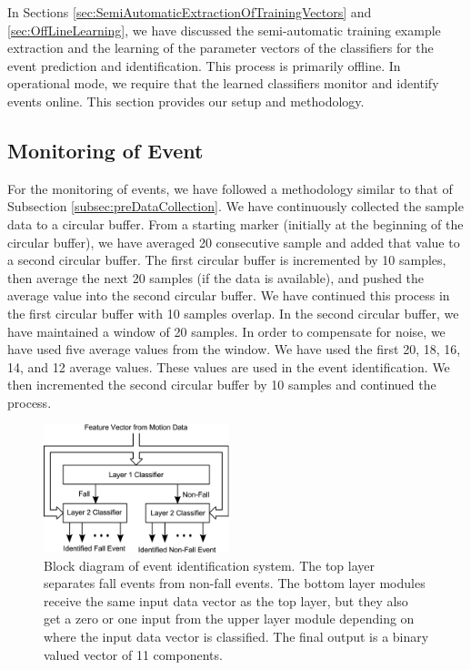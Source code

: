 \documentclass{IEEEtran}
\begin{document}
In Sections \ref{sec:SemiAutomaticExtractionOfTrainingVectors} and 
\ref{sec:OffLineLearning}, we have discussed the semi-automatic training example 
extraction and the learning of the parameter vectors of the classifiers for the event 
prediction and identification. This process is primarily offline. In operational mode, we 
require that the learned classifiers monitor and identify events online. This section 
provides our setup and methodology.  



\subsection{Monitoring of Event}

For the monitoring of events, we have followed a methodology similar to that of 
Subsection \ref{subsec:preDataCollection}. We have continuously collected the sample data 
to a circular buffer. From a starting marker (initially at the beginning of the circular buffer), 
we have averaged 20 consecutive sample and added that value to a second circular buffer. The 
first circular buffer is incremented by 10 samples, then average the next 20 samples (if the 
data 
is available), and pushed  the average value into the second circular buffer. We have 
continued this process in 
the first circular buffer with 10 samples overlap. In the second circular buffer, we have 
maintained a window of 20 samples. 
In order to compensate for noise, we have used five average values from the window. We 
have 
used the first 20, 18, 16, 14, and 12 average values. These  values are used in the event 
identification. We then incremented the second circular buffer by 10 samples and continued 
the process.  

\begin{figure}[h]
	\centering
		\includegraphics[width=0.48\textwidth]{figures/TrainedIdentificationModule.eps}
	\caption{Block diagram of event identification system. The top layer separates fall events from non-fall events. The bottom layer modules receive the same input data vector as the top layer, but they also get a zero or one input from the upper layer module depending on where the input data vector is classified. The final output is a binary valued vector of 11 components.}
	\label{fig:TrainedIdentificationModule}
\end{figure}
\end{document}
